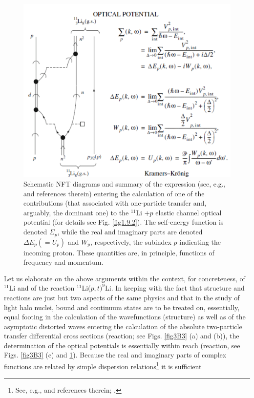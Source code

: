 \begin{figure}
\centerline{\includegraphics*[width=15cm,angle=0]{nutshell/figs/fig3B4.pdf}}
\caption{Schematic NFT diagrams and summary of the expression (see, e.g., \cite{Mahaux:85} and references therein) entering the calculation of one of
the contributions (that associated with one-particle transfer and, arguably, the dominant one) to the $^{11}$Li $+ p$ elastic channel
optical potential (for details see Fig. \ref{fig1.9.2}). The self-energy function is denoted $\Sigma_p$, while the real and imaginary parts are denoted $\Delta E_p (=U_p)$ and $W_p$,
respectively, the subindex $p$ indicating the incoming proton. These quantities are, in principle, functions of frequency and
momentum.}\label{fig3B4}
\end{figure}
Let us elaborate on the above arguments within the context, for concreteness, of $^{11}$Li and of the reaction $^{11}$Li($p,t)^9$Li. In keeping with the fact that structure and reactions
are just but two aspects of the same physics
and that in the study of light halo nuclei, bound and continuum
states are to be treated on, essentially, equal footing
in the calculation of the wavefunctions  (structure) as well as of the asymptotic
distorted waves entering  the calculation of the absolute
two-particle transfer differential cross sections
(reaction; see Figs. \ref{fig3B3} (a) and (b)), the determination
of the optical potentials is essentially within reach
(reaction, see Figs. \ref{fig3B3} (c) and \ref{fig3B4}).
Because the real and imaginary parts of complex
functions are related by simple dispersion relations\footnote{See, e.g., \cite{Mahaux:85} and references therein; \cite{Dickhoff:05}.} it is sufficient
